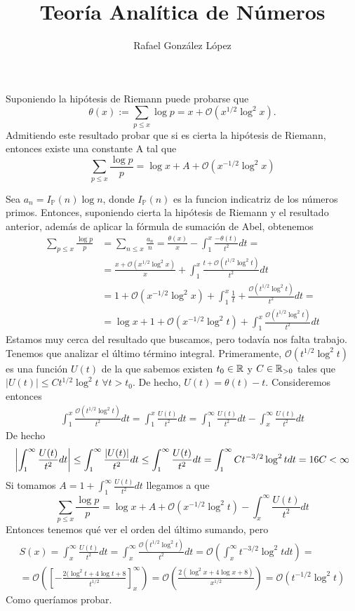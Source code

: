 \documentclass[twoside]{article}
\providecommand{\bo}[1]{\mathcal{O}\left(#1\right)}
\begin{document}
\title{Teoría Analítica de Números}
\author{Rafael González López}
\maketitle

\begin{ejercicio}{12}
Suponiendo la hipótesis de Riemann puede probarse que
$$
\theta(x):=\sum_{p\leq x}\log p = x + \mathcal{O}(x^{1/2}\log^2x).
$$
Admitiendo este resultado probar que si es cierta la hipótesis de Riemann, entonces existe una constante A tal que
$$
\sum_{p\leq x}\frac{\log p}{p} = \log x + A + \mathcal{O}(x^{-1/2}\log^2 x)
$$
\begin{sol}
\end{sol}
\end{ejercicio}
Sea $a_n = I_{\mathbb{P}}(n)\log n$, donde $I_{\mathbb{P}}(n)$ es la funcion indicatriz de los números primos. Entonces, suponiendo cierta la hipótesis de Riemann y el resultado anterior, además de aplicar la fórmula de sumación de Abel, obtenemos
\begin{align*}
\sum_{p\leq x}\frac{\log p}{p} &= \sum_{n\leq x}\frac{a_n}{n} = \frac{\theta(x)}{x} - \int_1^x \frac{-\theta(t)}{t^2}dt =\\
&= \frac{x + \mathcal{O}(x^{1/2}\log^2x)}{x} + \int_1^x \frac{t + \mathcal{O}(t^{1/2}\log^2t)}{t^2}dt\\
 &= 1+\mathcal{O}(x^{-1/2}\log^2 x) + \int_1^x \frac{1}{t} + \frac{\mathcal{O}(t^{1/2}\log^2 t)}{t^2}dt =\\
&=\log x + 1 + \mathcal{O}(x^{-1/2}\log^2 t)  + \int_1^x \frac{\mathcal{O}(t^{1/2}\log^2 t)}{t^2}dt
\end{align*}
Estamos muy cerca del resultado que buscamos, pero todavía nos falta trabajo. Tenemos que analizar el último término integral. Primeramente, $\mathcal{O}(t^{1/2}\log^2 t)$ es una función $U(t)$ de la que sabemos existen $t_0 \in \mathbb{R}$ y $C\in\mathbb{R}_{>0}$ tales que $|U(t)|\leq Ct^{1/2}\log^2 t$ $\forall t>t_0$. De hecho, $U(t)=\theta(t)-t$. Consideremos entonces
\begin{gather*}
\int_1^x \frac{\mathcal{O}(t^{1/2}\log^2 t)}{t^2}dt = \int_1^x \frac{U(t)}{t^2}dt = \int_1^\infty \frac{U(t)}{t^2}dt - \int_x^\infty \frac{U(t)}{t^2}dt
\end{gather*}
De hecho
$$
\left|{\int_1^\infty \frac{U(t)}{t^2}dt}\right| \leq \int_1^\infty \frac{\left|{U(t)}\right|}{t^2}dt \leq \int_1^\infty \frac{U(t)}{t^2}dt =\int_1^\infty  Ct^{-3/2}\log^2 t dt =16C<\infty
$$ Si tomamos $A = 1 + \int_1^\infty \frac{U(t)}{t^2}dt$ llegamos a que
$$
\sum_{p\leq x}\frac{\log p}{p} = \log x + A + \mathcal{O}(x^{-1/2}\log^2 t) - \int_x^\infty \frac{U(t)}{t^2}dt
$$
Entonces tenemos qué ver el orden del último sumando, pero
\begin{gather*}
S(x)= \int_x^\infty \frac{U(t)}{t^2}dt = \int_x^\infty \frac{\mathcal{O}(t^{1/2}\log^2 t)}{t^2}dt = \bo{\int_x^\infty  {t^{-3/2}\log^2 t}dt}=\\
=\bo{\left[-\frac{2(\log^2 t+4\log t + 8}{t^{1/2}}\right]_x^\infty }= \bo{\frac{2(\log^2 x+4\log x + 8)}{x^{1/2}}} = \mathcal{O}(t^{-1/2}\log^2 t)
\end{gather*}
Como queríamos probar. 
\end{document}
